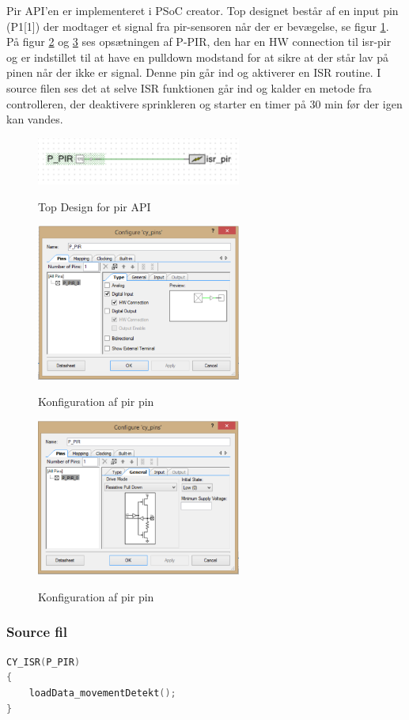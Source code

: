 Pir API'en er implementeret i PSoC creator. Top designet består af en input pin (P1[1]) der modtager et signal fra pir-sensoren når der er bevægelse, se figur \ref{lab:pir_topdesign}. På figur \ref{lab:pir_topdesign_1} og \ref{lab:pir_topdesign_2} ses opsætningen af P-PIR, den har en HW connection til isr-pir og er indstillet til at have en pulldown modstand for at sikre at der står lav på pinen når der ikke er signal. Denne pin går ind og aktiverer en ISR routine. I source filen ses det at selve ISR funktionen går ind og kalder en metode fra controlleren, der deaktivere sprinkleren og starter en timer på 30 min før der igen kan vandes.   

\begin{figure}[htb]
\centering
{\includegraphics[width=0.60\textwidth]{filer/pics/pir_api_topdesign}}
\caption{Top Design for pir API}
\label{lab:pir_topdesign}
\end{figure}

\begin{figure}[htb]
\centering
{\includegraphics[width=0.60\textwidth]{filer/pics/pir_api_topdesign_1}}
\caption{Konfiguration af pir pin}
\label{lab:pir_topdesign_1}
\end{figure}

\begin{figure}[H]
\centering
{\includegraphics[width=0.60\textwidth]{filer/pics/pir_api_topdesign_2}}
\caption{Konfiguration af pir pin}
\label{lab:pir_topdesign_2}
\end{figure}


\subsubsection*{Source fil}
\begin{lstlisting}[language=C]
CY_ISR(P_PIR)
{  
    loadData_movementDetekt();   
}
\end{lstlisting}